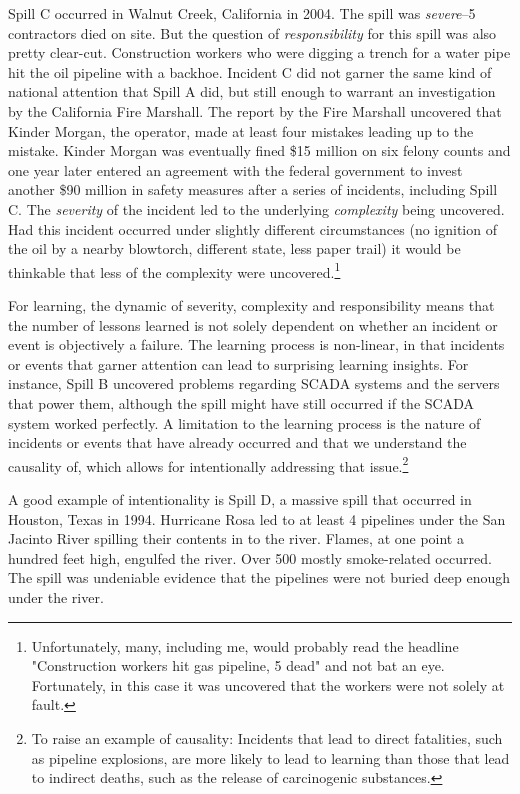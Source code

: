 \documentclass[12pt, man, natbib]{apa6}
\begin{document}
	Spill C occurred in Walnut Creek, California in 2004. The spill was \textit{severe}--5 contractors died on site. But the question of \textit{responsibility} for this spill was also pretty clear-cut. Construction workers who were digging a trench for a water pipe hit the oil pipeline with a backhoe. Incident C did not garner the same kind of national attention that Spill A did, but still enough to warrant an investigation by the California Fire Marshall. The report by the Fire Marshall uncovered that Kinder Morgan, the operator, made at least four mistakes leading up to the mistake. Kinder Morgan was eventually fined \$15 million on six felony counts and one year later entered an agreement with the federal government to invest another \$90 million in safety measures after a series of incidents, including Spill C. The \textit{severity} of the incident led to the underlying \textit{complexity} being uncovered. Had this incident occurred under slightly different circumstances (no ignition of the oil by a nearby blowtorch, different state, less paper trail) it would be thinkable that less of the complexity were uncovered.\footnote{Unfortunately, many, including me, would probably read the headline "Construction workers hit gas pipeline, 5 dead" and not bat an eye. Fortunately, in this case it was uncovered that the workers were not solely at fault.}	
	
	For learning, the dynamic of severity, complexity and responsibility means that the number of lessons learned is not solely dependent on whether an incident or event is objectively a failure. The learning process is non-linear, in that incidents or events that garner attention can lead to surprising learning insights. For instance, Spill B uncovered problems regarding SCADA systems and the servers that power them, although the spill might have still occurred if the SCADA system worked perfectly. A limitation to the learning process is the nature of incidents or events that have already occurred and that we understand the causality of, which allows for intentionally addressing that issue.\footnote{To raise an example of causality: Incidents that lead to direct fatalities, such as pipeline explosions, are more likely to lead to learning than those that lead to indirect deaths, such as the release of carcinogenic substances.}
	
	A good example of intentionality is Spill D, a massive spill that occurred in Houston, Texas in 1994. Hurricane Rosa led to at least 4 pipelines under the San Jacinto River spilling their contents in to the river. Flames, at one point a hundred feet high, engulfed the river. Over 500 mostly smoke-related occurred. The spill was undeniable evidence that the pipelines were not buried deep enough under the river. 
	
	
	
%	
	


\end{document}

